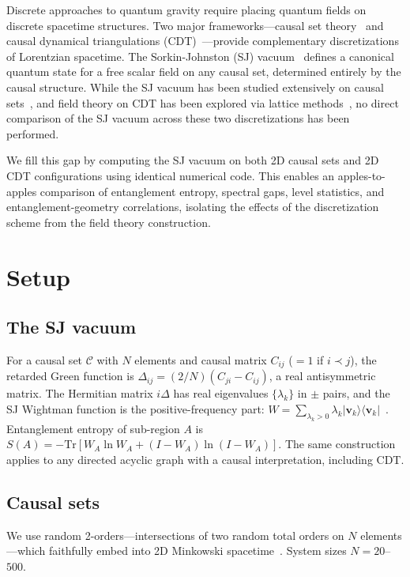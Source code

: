 \documentclass[aps,prd,twocolumn,superscriptaddress,nofootinbib]{revtex4-2}
\begin{document}
Discrete approaches to quantum gravity require placing quantum fields on discrete spacetime structures. Two major frameworks---causal set theory~\cite{bombelli1987,surya2019} and causal dynamical triangulations (CDT)~\cite{ambjorn2001,ambjorn2005}---provide complementary discretizations of Lorentzian spacetime. The Sorkin-Johnston (SJ) vacuum~\cite{johnston2009,sorkin2012} defines a canonical quantum state for a free scalar field on any causal set, determined entirely by the causal structure. While the SJ vacuum has been studied extensively on causal sets~\cite{sorkin_yazdi2018,saravani2014}, and field theory on CDT has been explored via lattice methods~\cite{ambjorn2008}, no direct comparison of the SJ vacuum across these two discretizations has been performed.

We fill this gap by computing the SJ vacuum on both 2D causal sets and 2D CDT configurations using identical numerical code. This enables an apples-to-apples comparison of entanglement entropy, spectral gaps, level statistics, and entanglement-geometry correlations, isolating the effects of the discretization scheme from the field theory construction.

\section{Setup}

\subsection{The SJ vacuum}

For a causal set $\mathcal{C}$ with $N$ elements and causal matrix $C_{ij}$ ($= 1$ if $i \prec j$), the retarded Green function is $\Delta_{ij} = (2/N)(C_{ji} - C_{ij})$, a real antisymmetric matrix. The Hermitian matrix $i\Delta$ has real eigenvalues $\{\lambda_k\}$ in $\pm$ pairs, and the SJ Wightman function is the positive-frequency part: $W = \sum_{\lambda_k > 0} \lambda_k |\mathbf{v}_k\rangle\langle\mathbf{v}_k|$~\cite{johnston2009}. Entanglement entropy of sub-region $A$ is $S(A) = -\mathrm{Tr}[W_A \ln W_A + (I - W_A)\ln(I - W_A)]$. The same construction applies to any directed acyclic graph with a causal interpretation, including CDT.

\subsection{Causal sets}

We use random 2-orders---intersections of two random total orders on $N$ elements---which faithfully embed into 2D Minkowski spacetime~\cite{glaser2018}. System sizes $N = 20$--$500$.
\end{document}
